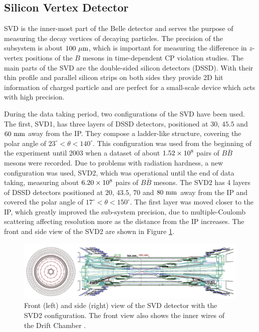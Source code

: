 
\subsection{Silicon Vertex Detector}
SVD is the inner-most part of the Belle detector and serves the purpose of measuring the decay vertices of decaying particles. The precision of the subsystem is about $100\mathrm{~\mu m}$, which is important for measuring the difference in $z$-vertex positions of the $B$ mesons in time-dependent CP violation studies. The main parts of the SVD are the double-sided silicon detectors (DSSD). With their thin profile and parallel silicon strips on both sides they provide 2D hit information of charged particle and are perfect for a small-scale device which acts with high precision.

During the data taking period, two configurations of the SVD have been used. The first, SVD1, has three layers of DSSD detectors, positioned at $30$, $45.5$ and $60\mathrm{~mm}$ away from the IP. They compose a ladder-like structure, covering the polar angle of $23^\circ < \theta < 140^\circ$. This configuration was used from the beginning of the experiment until 2003 when a dataset of about $1.52\times 10^{8}$ pairs of $B \bar B$ mesons were recorded. Due to problems with radiation hardness, a new configuration was used, SVD2, which was operational until the end of data taking, measuring about $6.20\times 10^{8}$ pairs of $B \bar B$ mesons. The SVD2 has 4 layers of DSSD detectors positioned at $20$, $43.5$, $70$ and $80\mathrm{~mm}$ away from the IP and covered the polar angle of $17^\circ < \theta < 150^\circ$. The first layer was moved closer to the IP, which greatly improved the sub-system precision, due to multiple-Coulomb scattering affecting resolution more as the distance from the IP increases. The front and side view of the SVD2 are shown in Figure \ref{fig:SVD_layout}.

\begin{figure}[H]
	\centering
	\captionsetup{width=0.8\linewidth}
	\includegraphics[width=\linewidth]{fig/setup/SVD_layout}
	\caption{Front (left) and side (right) view of the SVD detector with the SVD2 configuration. The front view also shows the inner wires of the
		Drift Chamber \cite{haba2004letter}.}
	\label{fig:SVD_layout}
\end{figure}

